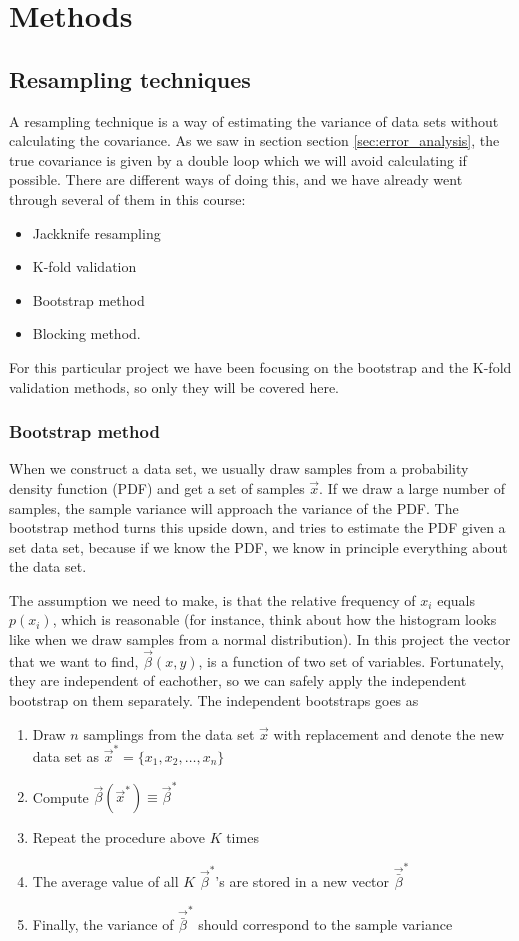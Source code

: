 \section{Methods} \label{sec:methods}

\subsection{Resampling techniques} \label{sec:resampling}
A resampling technique is a way of estimating the variance of data sets without calculating the covariance. As we saw in section section \ref{sec:error_analysis}, the true covariance is given by a double loop which we will avoid calculating if possible. There are different ways of doing this, and we have already went through several of them in this course:
\begin{itemize}
\item{Jackknife resampling}
\item{K-fold validation}
\item{Bootstrap method}
\item{Blocking method}.
\end{itemize}

For this particular project we have been focusing on the bootstrap and the K-fold validation methods, so only they will be covered here.

\subsubsection{Bootstrap method} \label{sec:bootstrap}
When we construct a data set, we usually draw samples from a probability density function (PDF) and get a set of samples $\vec{x}$. If we draw a large number of samples, the sample variance will approach the variance of the PDF. The bootstrap method turns this upside down, and tries to estimate the PDF given a set data set, because if we know the PDF, we know in principle everything about the data set. 

The assumption we need to make, is that the relative frequency of $x_i$ equals $p(x_i)$, which is reasonable (for instance, think about how the histogram looks like when we draw samples from a normal distribution). In this project the vector that we want to find, $\vec{\beta}(x,y)$, is a function of two set of variables. Fortunately, they are independent of eachother, so we can safely apply the independent bootstrap on them separately. The independent bootstraps goes as
\begin{enumerate}
\item Draw $n$ samplings from the data set $\vec{x}$ with replacement and denote the new data set as $\vec{x}^*=\{x_1,x_2,\hdots,x_n\}$
\item Compute $\vec{\beta}(\vec{x}^*)\equiv\vec{\beta}^*$
\item Repeat the procedure above $K$ times
\item The average value of all $K$ $\vec{\beta}^*$'s are stored in a new vector $\vec{\bar{\beta}}^*$
\item Finally, the variance of $\vec{\bar{\beta}}^*$ should correspond to the sample variance
\end{enumerate}
\cite{BootstrapEfron}

